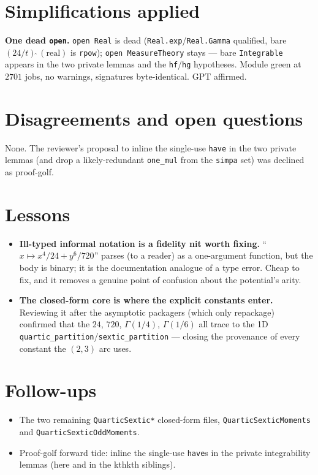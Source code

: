 \documentclass[11pt]{article}
\begin{document}
\section{Simplifications applied}
\textbf{One dead \texttt{open}.} \texttt{open Real} is dead (\texttt{Real.exp}/\texttt{Real.Gamma}
qualified, bare $(24/t)\,\hat{}\,(\text{real})$ is \texttt{rpow}); \texttt{open MeasureTheory} stays
--- bare \texttt{Integrable} appears in the two private lemmas and the \texttt{hf}/\texttt{hg}
hypotheses. Module green at $2701$ jobs, no warnings, signatures byte-identical. GPT affirmed.

\section{Disagreements and open questions}
None. The reviewer's proposal to inline the single-use \texttt{have} in the two private lemmas (and
drop a likely-redundant \texttt{one\_mul} from the \texttt{simpa} set) was declined as proof-golf.

\section{Lessons}
\begin{itemize}[noitemsep]
  \item \textbf{Ill-typed informal notation is a fidelity nit worth fixing.} ``$x\mapsto
    x^4/24+y^6/720$'' parses (to a reader) as a one-argument function, but the body is binary; it is
    the documentation analogue of a type error. Cheap to fix, and it removes a genuine
    point of confusion about the potential's arity.
  \item \textbf{The closed-form core is where the explicit constants enter.} Reviewing it after the
    asymptotic packagers (which only repackage) confirmed that the $24$, $720$, $\Gamma(1/4)$,
    $\Gamma(1/6)$ all trace to the 1D \texttt{quartic\_partition}/\texttt{sextic\_partition} ---
    closing the provenance of every constant the $(2,3)$ arc uses.
\end{itemize}

\section{Follow-ups}
\begin{itemize}[noitemsep]
  \item The two remaining \texttt{QuarticSextic*} closed-form files,
    \texttt{QuarticSexticMoments} and \texttt{QuarticSexticOddMoments}.
  \item Proof-golf forward tide: inline the single-use \texttt{have}s in the private integrability
    lemmas (here and in the kthkth siblings).
\end{itemize}
\end{document}
